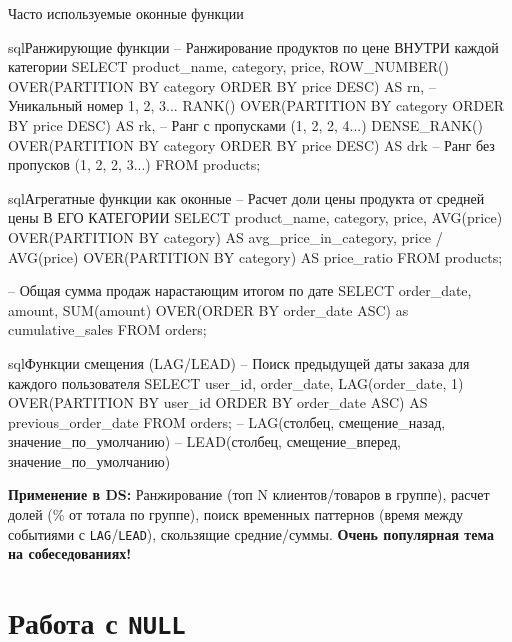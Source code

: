 \begin{myexampleblock}{Часто используемые оконные функции}
    \begin{codebox}{sql}{Ранжирующие функции}
    -- Ранжирование продуктов по цене ВНУТРИ каждой категории
    SELECT
        product_name,
        category,
        price,
        ROW_NUMBER() OVER(PARTITION BY category ORDER BY price DESC) AS rn, -- Уникальный номер 1, 2, 3...
        RANK()       OVER(PARTITION BY category ORDER BY price DESC) AS rk, -- Ранг с пропусками (1, 2, 2, 4...)
        DENSE_RANK() OVER(PARTITION BY category ORDER BY price DESC) AS drk -- Ранг без пропусков (1, 2, 2, 3...)
    FROM products;
    \end{codebox}
    \begin{codebox}{sql}{Агрегатные функции как оконные}
    -- Расчет доли цены продукта от средней цены В ЕГО КАТЕГОРИИ
    SELECT
        product_name,
        category,
        price,
        AVG(price) OVER(PARTITION BY category) AS avg_price_in_category,
        price / AVG(price) OVER(PARTITION BY category) AS price_ratio
    FROM products;

    -- Общая сумма продаж нарастающим итогом по дате
    SELECT
      order_date,
      amount,
      SUM(amount) OVER(ORDER BY order_date ASC) as cumulative_sales
    FROM orders;
    \end{codebox}
    \begin{codebox}{sql}{Функции смещения (LAG/LEAD)}
    -- Поиск предыдущей даты заказа для каждого пользователя
    SELECT
        user_id,
        order_date,
        LAG(order_date, 1) OVER(PARTITION BY user_id ORDER BY order_date ASC) AS previous_order_date
    FROM orders;
    -- LAG(столбец, смещение_назад, значение_по_умолчанию)
    -- LEAD(столбец, смещение_вперед, значение_по_умолчанию)
    \end{codebox}
    \textbf{Применение в DS:} Ранжирование (топ N клиентов/товаров в группе), расчет долей (\% от тотала по группе), поиск временных паттернов (время между событиями с \texttt{LAG}/\texttt{LEAD}), скользящие средние/суммы. \textbf{Очень популярная тема на собеседованиях!}
\end{myexampleblock}

\section{Работа с \texttt{NULL}}

